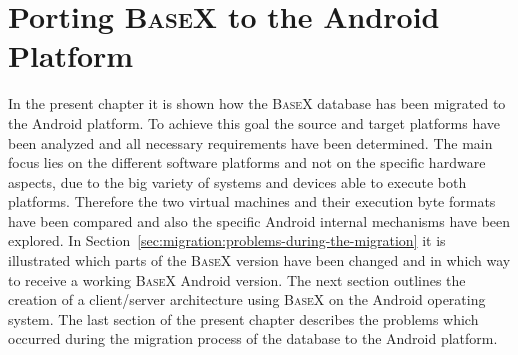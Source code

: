 \chapter{Porting \textsc{BaseX} to the Android Platform}
\label{sec:migration:porting-basex-to-android}
In the present chapter it is shown how the \textsc{BaseX} database has been migrated to the Android platform.
To achieve this goal the source and target platforms have been analyzed and all necessary requirements have been determined.
The main focus lies on the different software platforms and not on the specific hardware aspects, due to the big variety of systems and devices able to execute both platforms. 
Therefore the two virtual machines and their execution byte formats have been compared and also the specific Android internal mechanisms have been explored.
In Section~\ref{sec:migration:problems-during-the-migration} it is illustrated which parts of the \textsc{BaseX} version have been changed and in which way to receive a working \textsc{BaseX} Android version.
The next section outlines the creation of a client/server architecture using \textsc{BaseX} on the Android operating system.
The last section of the present chapter describes the problems which occurred during the migration process of the database to the Android platform.


